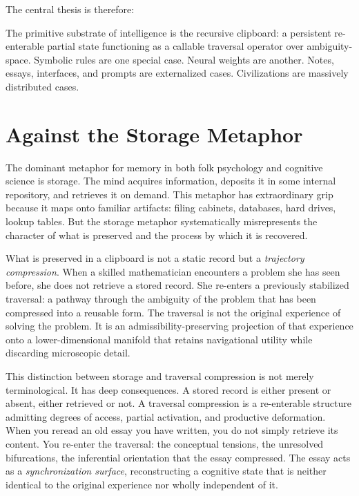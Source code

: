 \documentclass[12pt,oneside]{book}
\newcounter{thesisctr}
\newenvironment{thesis}[1][]{%
  \refstepcounter{thesisctr}%
  \begin{tcolorbox}[
    enhanced,
    breakable,
    colback=cliplight,
    colframe=clipblue,
    fonttitle=\bfseries\small,
    title={Thesis~\thethesisctr\ifx&#1&\else~(#1)\fi},
    left=6pt, right=6pt, top=4pt, bottom=4pt,
    arc=2pt
  ]
}{%
  \end{tcolorbox}
}
\theoremstyle{plain}
\theoremstyle{definition}
\theoremstyle{plain}
\begin{document}
The central thesis is therefore:

\begin{thesis}[The Clipboard Primitive]
The primitive substrate of intelligence is the recursive clipboard: a persistent re-enterable partial state functioning as a callable traversal operator over ambiguity-space. Symbolic rules are one special case. Neural weights are another. Notes, essays, interfaces, and prompts are externalized cases. Civilizations are massively distributed cases.
\end{thesis}

\section{Against the Storage Metaphor}

The dominant metaphor for memory in both folk psychology and cognitive science is storage. The mind acquires information, deposits it in some internal repository, and retrieves it on demand. This metaphor has extraordinary grip because it maps onto familiar artifacts: filing cabinets, databases, hard drives, lookup tables. But the storage metaphor systematically misrepresents the character of what is preserved and the process by which it is recovered.

What is preserved in a clipboard is not a static record but a \emph{trajectory compression}. When a skilled mathematician encounters a problem she has seen before, she does not retrieve a stored record. She re-enters a previously stabilized traversal: a pathway through the ambiguity of the problem that has been compressed into a reusable form. The traversal is not the original experience of solving the problem. It is an admissibility-preserving projection of that experience onto a lower-dimensional manifold that retains navigational utility while discarding microscopic detail.

This distinction between storage and traversal compression is not merely terminological. It has deep consequences. A stored record is either present or absent, either retrieved or not. A traversal compression is a re-enterable structure admitting degrees of access, partial activation, and productive deformation. When you reread an old essay you have written, you do not simply retrieve its content. You re-enter the traversal: the conceptual tensions, the unresolved bifurcations, the inferential orientation that the essay compressed. The essay acts as a \emph{synchronization surface}, reconstructing a cognitive state that is neither identical to the original experience nor wholly independent of it.
\end{document}
